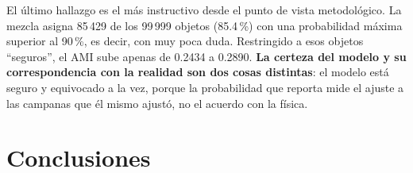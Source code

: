 \documentclass[10pt,journal]{IEEEtran}
\begin{document}
  El \'ultimo hallazgo es el m\'as instructivo desde el punto de vista metodol\'ogico. La mezcla asigna 85\,429 de los 99\,999 objetos (85.4\,\%) con una probabilidad m\'axima superior al 90\,\%, es decir, con muy poca duda. Restringido a esos objetos ``seguros'', el AMI sube apenas de 0.2434 a 0.2890. \textbf{La certeza del modelo y su correspondencia con la realidad son dos cosas distintas}: el modelo est\'a seguro y equivocado a la vez, porque la probabilidad que reporta mide el ajuste a las campanas que \'el mismo ajust\'o, no el acuerdo con la f\'isica.

  \FloatBarrier

  \section{Conclusiones}
\end{document}
